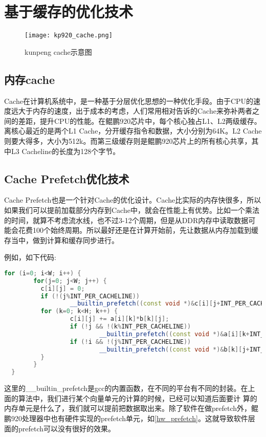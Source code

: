 \section{基于缓存的优化技术}

\begin{figure}[htbp]
    \centering
    \texttt{[image: kp920\_cache.png]}
    \caption{kunpeng cache示意图}
    \label{kunpeng cache示意图}
\end{figure}


\subsection{内存cache}

Cache在计算机系统中，是一种基于分层优化思想的一种优化手段。由于CPU的速度远大于内存的速度，出于成本的考虑，人们常用相对告诉的Cache来弥补两者之间的差距，提升CPU的性能。在鲲鹏920芯片中，每个核心独占L1、L2两级缓存。离核心最近的是两个L1 Cache，分开缓存指令和数据，大小分别为64K。L2 Cache则要大得多，大小为512k。而第三级缓存则是鲲鹏920芯片上的所有核心共享，其中L3 Cacheline的长度为128个字节。

\subsection{Cache Prefetch优化技术}
Cache Prefetch也是一个针对Cache的优化设计。Cache比实际的内存快很多，所以如果我们可以提前加载部分内存到Cache中，就会在性能上有优势。比如一个乘法的时间，就算不考虑流水线，也不过3-12个周期，但是从DDR内存中读取数据可能会花费100个始终周期。所以最好还是在计算开始前，先让数据从内存加载到缓存当中，做到计算和缓存同步进行。

例如，如下代码:
\begin{lstlisting}[language=c++]
    for (i=0; i<W; i++) {
        for(j=0; j<W; j++) {
          c[i][j] = 0;
          if (!(j%INT_PER_CACHELINE))
                  __builtin_prefetch((const void *)&c[i][j+INT_PER_CACHELINE], 1, 3);
          for (k=0; k<H; k++) {
                  c[i][j] += a[i][k]*b[k][j];
                  if (!j && !(k%INT_PER_CACHELINE))
                          __builtin_prefetch((const void *)&a[i][k+INT_PER_CACHELINE], 0, 3);
                  if (!i && !(j%INT_PER_CACHELINE))
                          __builtin_prefetch((const void *)&b[k][j+INT_PER_CACHELINE], 0, 3);
          }
        }
  }
\end{lstlisting}
这里的\_\_builtin\_prefetch是gcc的内置函数，在不同的平台有不同的封装。在上面的算法中，我们进行某个向量单元的计算的时候，已经可以知道后面要计 算的内存单元是什么了，我们就可以提前把数据取出来。除了软件在做prefetch外，鲲鹏920处理器中也有硬件实现的prefetch单元，如\ref{hw_prefetch}。这就导致软件层面的prefetch可以没有很好的效果。

